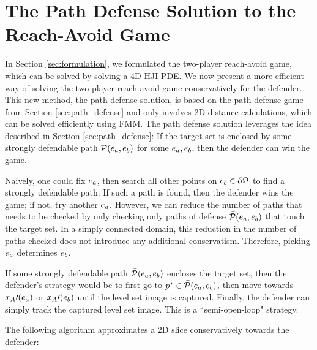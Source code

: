 \section{The Path Defense Solution to the Reach-Avoid Game}
\label{sec:reach_avoid}
In Section \ref{sec:formulation}, we formulated the two-player reach-avoid game, which can be solved by solving a 4D HJI PDE. We now present a more efficient way of solving the two-player reach-avoid game conservatively for the defender. This new method, the path defense solution, is based on the path defense game from Section \ref{sec:path_defense} and only involves 2D distance calculations, which can be solved efficiently using FMM. The path defense solution leverages the idea described in Section \ref{sec:path_defense}: If the target set is enclosed by some strongly defendable path $\bar{\mathcal{P}}(e_a,e_b)$ for some $e_a,e_b$, then the defender can win the game. 


Naively, one could fix $e_a$, then search all other points on $e_b\in\partial\Omega$ to find a strongly defendable path. If such a path is found, then the defender wins the game; if not, try another $e_a$. However, we can reduce the number of paths that needs to be checked by only checking only paths of defense $\bar{\mathcal{P}}(e_a,e_b)$ that touch the target set. In a simply connected domain, this reduction in the number of paths checked does not introduce any additional conservatism. Therefore, picking $e_a$ determines $e_b$. 

If some strongly defendable path $\bar{\mathcal{P}}(e_a,e_b)$ encloses the target set, then the defender's strategy would be to first go to $p^*\in\bar{\mathcal{P}}(e_a,e_b)$, then move towards $x_A\prime(e_a)$ or $x_A\prime(e_b)$ until the level set image is captured. Finally, the defender can simply track the captured level set image. This is a ``semi-open-loop" strategy. %

The following algorithm approximates a 2D slice conservatively towards the defender:

